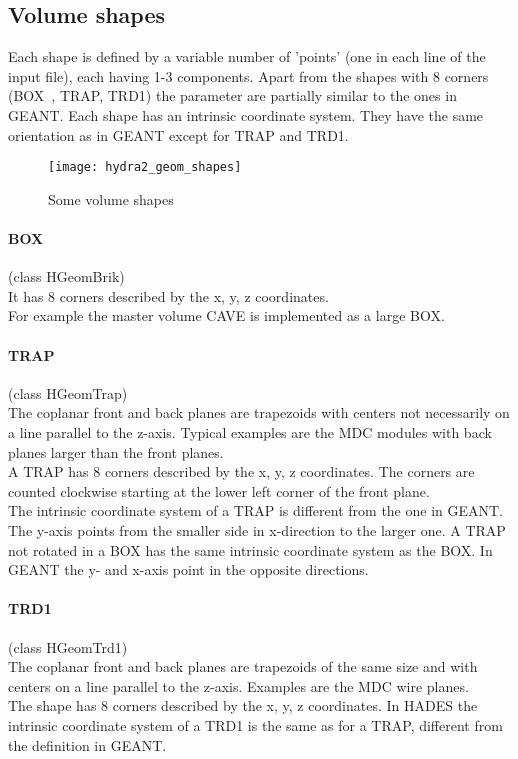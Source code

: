 \subsection[Volume shapes]{Volume shapes} \label{sec:geomShapes}

Each shape is defined by a variable number of 'points' (one in each line of the input file), each having 1-3 components. 
Apart from the shapes with 8 corners (BOX~, TRAP, TRD1) the parameter are partially similar to the ones in GEANT.
Each shape has an intrinsic coordinate system. They have the same orientation as in GEANT except for TRAP and TRD1.

\begin{figure}[\htb]
  \centering
  \texttt{[image: hydra2\_geom\_shapes]}
  \caption[Some volume shapes]{Some volume shapes} \label{fig:geomtryShapes}
\end{figure}

\paragraph{BOX} (class HGeomBrik)\\
It has 8 corners described by the x, y, z coordinates.\\
For example the master volume CAVE is implemented as a large BOX.

\paragraph{TRAP} (class HGeomTrap)\\
The coplanar front and back planes are trapezoids with centers not necessarily on a line parallel to the z-axis. Typical 
examples are the MDC modules with back planes larger than the front planes.\\
A TRAP has 8 corners described by the x, y, z coordinates. The corners are counted clockwise starting at the lower left 
corner of the front plane.\\
The intrinsic coordinate system of a TRAP is different from the one in GEANT. The y-axis points from the smaller side in 
x-direction to the larger one. A TRAP not rotated in a BOX has the same intrinsic coordinate system as the BOX. In GEANT 
the y- and x-axis point in the opposite directions.

\paragraph{TRD1} (class HGeomTrd1)\\
The coplanar front and back planes are trapezoids of the same size and with centers on a line parallel to the z-axis. 
Examples are the MDC wire planes.\\
The shape has 8 corners described by the x, y, z coordinates. In HADES the intrinsic coordinate system of a TRD1 is the 
same as for a TRAP, different from the definition in GEANT.

